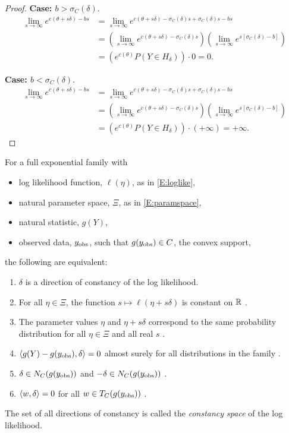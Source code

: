 \begin{proof}
\textbf{Case: $b > \sigma_C(\delta)$}.
\begin{align*}
	\lim_{s\to \infty} e^{ c(\theta + s \delta ) - bs } &= 
	\lim_{s\to \infty} e^{ c(\theta + s \delta ) - \sigma_C(\delta)s + \sigma_C
(\delta)s - bs }  \\
	&= \left( \lim_{s\to \infty} e^{ c(\theta + s \delta ) - \sigma_C(\delta)s} 
\right ) \left(  \lim_{s\to \infty} e^{ s[ \sigma_C(\delta) - b] } \right )\\
	&= \left (e^{c(\theta) }P(Y\in H_\delta) \right ) \cdot 0 = 0.
\end{align*}

\textbf{Case: $b < \sigma_C(\delta)$}.
\begin{align*}
	\lim_{s\to \infty} e^{ c(\theta + s \delta ) - bs } &= 
	\lim_{s\to \infty} e^{ c(\theta + s \delta ) - \sigma_C(\delta)s + \sigma_C
(\delta)s - bs }  \\
	&= \left( \lim_{s\to \infty} e^{ c(\theta + s \delta ) - \sigma_C(\delta)s} 
\right ) \left(  \lim_{s\to \infty} e^{ s[ \sigma_C(\delta) - b] } \right )\\
	&= \left (e^{c(\theta) }P(Y\in H_\delta) \right ) \cdot \left ( + \infty \right ) 
= + \infty.
\end{align*}
\end{proof}


\begin{theorem} \label{Thm:DOC}
For a full exponential family with
\begin{itemize}
\item log likelihood function, $\ell(\eta)$, as in \eqref{E:loglike},
\item natural parameter space, $\Xi$, as in \eqref{E:paramspace},
\item natural statistic, $g(Y)$,
\item observed data, $y_{\textrm{obs}}$, such that $g(y_{\textrm{obs}}) \in C$, the convex 
support,
\end{itemize}
the following are equivalent:
\begin{enumerate}
\item $\delta$ is a direction of constancy of the log likelihood.
\item For all $\eta \in \Xi$, the function $s \mapsto \ell( \eta + s\delta)$ is 
constant on ${\mathbb R}$ \cite[Theorem 1 (b)]{Geyer:gdor}.
\item The parameter values $\eta$ and  $\eta + s\delta$ correspond to the same 
probability distribution for all $\eta \in \Xi$ and all real $s$ \cite[Theorem 1 (d)]
{Geyer:gdor}.
\item $\langle g(Y) - g(y_{\textrm{obs}}),\delta \rangle = 0$ almost surely for all distributions in the 
family \cite[Theorem 1 (f)]{Geyer:gdor}.
\item $\delta \in N_C(g(y_{\textrm{obs}}))$ and $-\delta \in N_C(g(y_{\textrm{obs}}))$ \cite[Theorem 1 (g)]
{Geyer:gdor}.
\item $\langle w,\delta \rangle = 0$ for all $w \in T_C(g(y_{\textrm{obs}}))$ \cite[Theorem 1 (h)]
{Geyer:gdor}.
\end{enumerate}
\end{theorem}
The set of all directions of constancy is called the \emph{constancy space} of the log 
likelihood.

